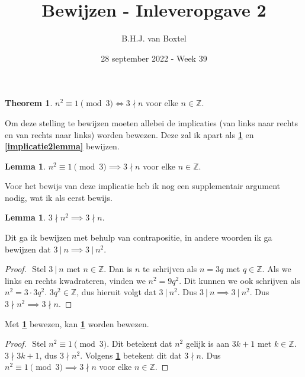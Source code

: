 \documentclass[12pt, dutch, a4paper]{article}
\theoremstyle{definition}
\newtheorem{theorem}{Theorem}
\newtheorem{lemma}{Lemma}[theorem]
\newtheorem{sublemma}{Lemma}[lemma]
\begin{document}
\title{Bewijzen - Inleveropgave 2}
\author{B.H.J. van Boxtel}
\date{28 september 2022 - Week 39} 

\maketitle
{} 

\begin{theorem} \label{maintheorem}
    $n^2 \equiv 1 \pmod{3} \iff 3 \nmid n$ voor elke $n \in \mathbb{Z}$. 
\end{theorem}   

Om deze stelling te bewijzen moeten allebei de implicaties 
(van links naar rechts en van rechts naar links) worden bewezen. Deze zal ik apart
als \textbf{\cref{implicatie1lemma}} en \textbf{\cref{implicatie2lemma}} bewijzen.

\begin{lemma} \label{implicatie1lemma}
    $n^2 \equiv 1 \pmod{3} \implies 3 \nmid n$ voor elke $n \in \mathbb{Z}$. 
\end{lemma}
Voor het bewijs van deze implicatie heb ik nog een supplementair argument nodig, 
wat ik als eerst bewijs. 

\begin{sublemma} \label{sublemma1}
    $3 \nmid n^2 \implies 3 \nmid n$.
\end{sublemma}

Dit ga ik bewijzen met behulp van contrapositie, in andere woorden ik ga bewijzen dat
$3 \: | \: n \implies 3 \: | \: n^2$.
\begin{proof} $ $\newline
    Stel $3 \: | \: n$ met $n \in \mathbb{Z}$. \newline
    Dan is $n$ te schrijven als $n = 3q$ met $q \in \mathbb{Z}$. \newline
    Als we links en rechts kwadrateren, 
    vinden we $n^2 = 9q^2$. \newline
    Dit kunnen we ook schrijven als $n^2 = 3 \cdot 3q^2$. \newline
    $3q^2 \in \mathbb{Z}$, dus hieruit volgt dat $3 \: | \: n^2$. \newline 
    Dus $3 \: | \: n \implies 3 \: | \: n^2$. \newline
    Dus $3 \nmid n^2 \implies 3 \nmid n$.
\end{proof}

Met \textbf{\cref{sublemma1}} bewezen, 
kan \textbf{\cref{implicatie1lemma}} worden bewezen.
\begin{proof} $ $\newline
    Stel $n^2 \equiv 1 \pmod{3}$. \newline
    Dit betekent dat $n^2$ gelijk is aan $3k+1$ met $k \in \mathbb{Z}$. \newline
    $3 \nmid 3k + 1$, dus $3 \nmid n^2$. \newline
    Volgens \textbf{\cref{sublemma1}} betekent dit dat $3 \nmid n$. \newline
    Dus $n^2 \equiv 1 \pmod{3} \implies 3 \nmid n$ voor elke $n \in \mathbb{Z}$.
\end{proof}
\end{document}
